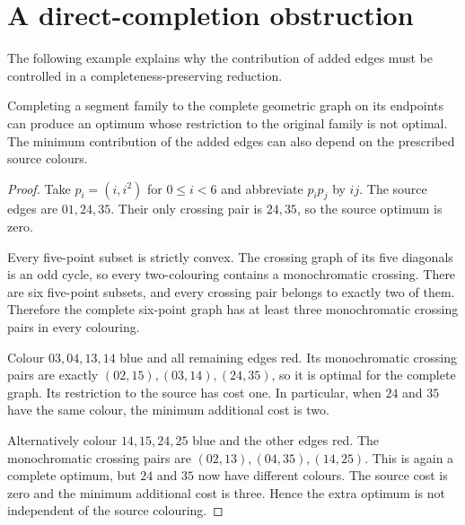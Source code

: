 \section{A direct-completion obstruction}\label{app:completion}

The following example explains why the contribution of added edges must
be controlled in a completeness-preserving reduction.

\begin{proposition}
Completing a segment family to the complete geometric graph on its
endpoints can produce an optimum whose restriction to the original
family is not optimal. The minimum contribution of the added edges can
also depend on the prescribed source colours.
\end{proposition}
\begin{proof}
Take $p_i=(i,i^2)$ for $0\leq i<6$ and abbreviate $p_ip_j$ by $ij$.
The source edges are $01,24,35$. Their only crossing pair is $24,35$,
so the source optimum is zero.

Every five-point subset is strictly convex. The crossing graph of its
five diagonals is an odd cycle, so every two-colouring contains a
monochromatic crossing. There are six five-point subsets, and every
crossing pair belongs to exactly two of them. Therefore the complete
six-point graph has at least three monochromatic crossing pairs in
every colouring.

Colour $03,04,13,14$ blue and all remaining edges red. Its monochromatic
crossing pairs are exactly $(02,15),(03,14),(24,35)$, so it is optimal
for the complete graph. Its restriction to the source has cost one.
In particular, when $24$ and $35$ have the same colour, the minimum
additional cost is two.

Alternatively colour $14,15,24,25$ blue and the other edges red.
The monochromatic crossing pairs are $(02,13),(04,35),(14,25)$.
This is again a complete optimum, but $24$ and $35$ now have different
colours. The source cost is zero and the minimum additional cost is
three. Hence the extra optimum is not independent of the source
colouring.
\end{proof}
